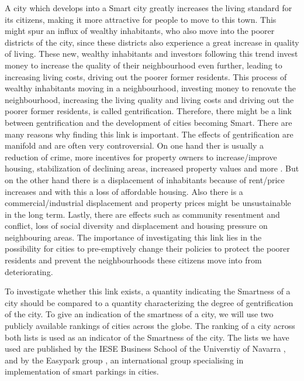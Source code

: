\documentclass[a4paper, 10pt]{IEEEconf}      %
\begin{document}
A city which develops into a Smart city greatly increases the living standard
for its citizens, making it more attractive for people to move to this town. This might spur an 
influx of wealthy inhabitants, who also move into the poorer districts of the city,
since these districts also experience a great increase in quality of living. These new,
wealthy inhabitants and investors following this trend invest money to increase the quality of their neighbourhood even further,
leading to increasing living costs, driving out the poorer former residents. This 
process of wealthy inhabitants moving in a neighbourhood, investing money to renovate
the neighbourhood, increasing the living quality and living costs and
driving out the poorer former residents, is called gentrification. Therefore, 
there might be a link between gentrification and the development of cities becoming Smart. There are many reasons why finding this link is important. The effects of gentrification are manifold and are often very controversial. On one hand ther is usually a reduction of crime, more incentives for property owners to increase/improve housing, stabilization of declining areas, increased property values and more \cite{c5}. But on the other hand there is a displacement of inhabitants because of rent/price increases and with this a loss of affordable housing. Also there is a commercial/industrial displacement and property prices might be unsustainable in the long term. Lastly, there are effects such as community resentment and conflict, loss of social diversity and displacement and housing pressure on neighbouring areas\cite{c5}.
The importance of investigating this link lies in the possibility for cities to pre-emptively
change their policies to protect the poorer residents and prevent the neighbourhoods these
citizens move into from deteriorating.

To investigate whether this link exists, a quantity indicating the Smartness
of a city should be compared to a quantity characterizing the degree of gentrification
of the city. To give an indication of the smartness of a city, we will use two publicly
available rankings of cities across the globe. The ranking of a city across both lists
is used as an indicator of the Smartness of the city. The lists we have used are published
by the IESE Business School of the Universtiy of Navarra \cite{c1}, and by the Easypark group \cite{c2},
an international group specialising in implementation of smart parkings in cities.
\end{document}

